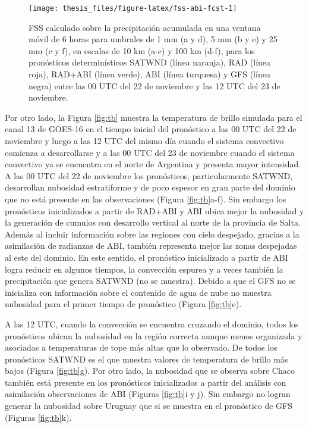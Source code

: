 \documentclass[12pt,oneside,a4paper]{reedthesis}
\begin{document}
\begin{figure}
\texttt{[image: thesis\_files/figure-latex/fss-abi-fcst-1]} \caption{FSS calculado sobre la precipitación acumulada en una ventana móvil de 6 horas para umbrales de 1 mm (a y d), 5 mm (b y e) y 25 mm (c y f), en escalas de 10 km (a-c) y 100 km (d-f), para los pronósticos determinísticos SATWND (línea naranja), RAD (línea roja), RAD+ABI (línea verde), ABI (línea turquesa) y GFS (línea negra) entre las 00 UTC del 22 de noviembre y las 12 UTC del 23 de noviembre.}\label{fig:fss-abi-fcst}
\end{figure}
Por otro lado, la Figura \ref{fig:tb} muestra la temperatura de brillo simulada para el canal 13 de GOES-16 en el tiempo inicial del pronóstico a las 00 UTC del 22 de noviembre y luego a las 12 UTC del mismo día cuando el sistema convectivo comienza a desarrollarse y a las 00 UTC del 23 de noviembre cuando el sistema convectivo ya se encuentra en el norte de Argentina y presenta mayor intensidad. A las 00 UTC del 22 de noviembre los pronósticos, particularmente SATWND, desarrollan nubosidad estratiforme y de poco espesor en gran parte del dominio que no está presente en las observaciones (Figura \ref{fig:tb}a-f). Sin embargo los pronósticos inicializados a partir de RAD+ABI y ABI ubica mejor la nubosidad y la generación de cumulos con desarrollo vertical al norte de la provincia de Salta. Además al incluir información sobre las regiones con cielo despejado, gracias a la asimilación de radianzas de ABI, también representa mejor las zonas despejadas al este del dominio. En este sentido, el pronóstico inicializado a partir de ABI logra reducir en algunos tiempos, la convección espurea y a veces también la precipitación que genera SATWND (no se muestra). Debido a que el GFS no se inicializa con información sobre el contenido de agua de nube no muestra nubosidad para el primer tiempo de pronóstico (Figura \ref{fig:tb}e).

A las 12 UTC, cuando la convección se encuentra cruzando el dominio, todos los pronósticos ubican la nubosidad en la región correcta aunque menos organizada y asociadas a temperaturas de tope más altas que lo observado. De todos los pronósticos SATWND es el que muestra valores de temperatura de brillo más bajos (Figura \ref{fig:tb}g). Por otro lado, la nubosidad que se observa sobre Chaco también está presente en los pronósticos inicializados a partir del análisis con asimilación observaciones de ABI (Figuras \ref{fig:tb}i y j). Sin embargo no logran generar la nubosidad sobre Uruguay que si se muestra en el pronóstico de GFS (Figuras \ref{fig:tb}k).
\end{document}
